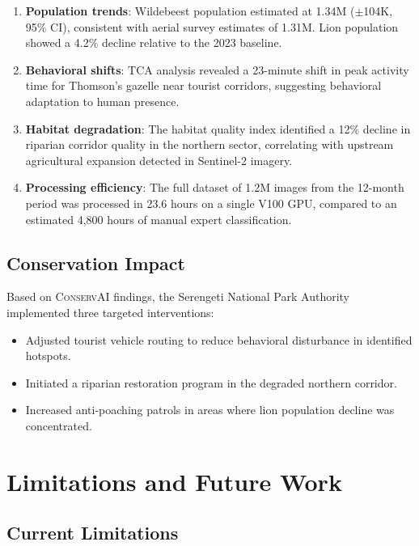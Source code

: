 \documentclass[11pt,letterpaper]{article}
\newcommand{\ConservAI}{\textsc{ConservAI}}
\begin{document}
\begin{enumerate}[leftmargin=*]
    \item \textbf{Population trends}: Wildebeest population estimated at 1.34M ($\pm$104K, 95\% CI), consistent with aerial survey estimates of 1.31M. Lion population showed a 4.2\% decline relative to the 2023 baseline.
    \item \textbf{Behavioral shifts}: TCA analysis revealed a 23-minute shift in peak activity time for Thomson's gazelle near tourist corridors, suggesting behavioral adaptation to human presence.
    \item \textbf{Habitat degradation}: The habitat quality index identified a 12\% decline in riparian corridor quality in the northern sector, correlating with upstream agricultural expansion detected in Sentinel-2 imagery.
    \item \textbf{Processing efficiency}: The full dataset of 1.2M images from the 12-month period was processed in 23.6 hours on a single V100 GPU, compared to an estimated 4,800 hours of manual expert classification.
\end{enumerate}

\subsection{Conservation Impact}

Based on \ConservAI{} findings, the Serengeti National Park Authority implemented three targeted interventions:

\begin{itemize}[leftmargin=*]
    \item Adjusted tourist vehicle routing to reduce behavioral disturbance in identified hotspots.
    \item Initiated a riparian restoration program in the degraded northern corridor.
    \item Increased anti-poaching patrols in areas where lion population decline was concentrated.
\end{itemize}

\section{Limitations and Future Work}

\subsection{Current Limitations}
\end{document}
